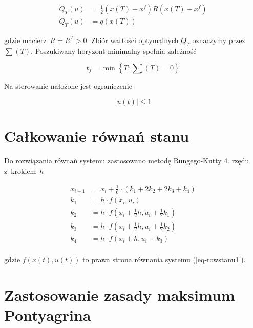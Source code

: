 \documentclass[11pt]{mwart}
\begin{document}
\begin{equation}
	\label{eq-wskjakosci}
	\begin{split}
		Q_{T}\left(u\right) &= \frac{1}{2}\left(x\left(T\right)-x^f\right)R\left(x\left(T\right)-x^f\right) \\
		Q_{T}\left(u\right) &= q\left(x\left(T\right)\right)
	\end{split}
\end{equation}

gdzie macierz~$R=R^T>0$. Zbiór wartości optymalnych $Q_T$ oznaczymy przez~$\sum\left(T\right)$. Poszukiwany horyzont minimalny spełnia zależność

\begin{equation}
	t_{f}=\min\left\{T:\sum\left(T\right)=0\right\}
\end{equation}

Na sterowanie nałożone jest ograniczenie 

\begin{equation}
	\left|u\left(t\right)\right|\leq 1
\end{equation}

\newpage{}

\section{Całkowanie równań stanu}

Do rozwiązania równań systemu zastosowano metodę Rungego-Kutty 4. rzędu z~krokiem~$h$

\begin{equation}
	\begin{split}
		x_{i+1} &= x_{i} + \frac{1}{6}\cdot\left(k_{1}+2k_{2}+2k_{3}+k_{4}\right) \\
		k_{1} &= h\cdot f\left(x_{i},u_{i}\right) \\
		k_{2} &= h\cdot f\left(x_{i}+\frac{1}{2}h,u_{i}+\frac{1}{2}k_{1}\right) \\
		k_{3} &= h\cdot f\left(x_{i}+\frac{1}{2}h,u_{i}+\frac{1}{2}k_{2}\right) \\
		k_{4} &= h\cdot f\left(x_{i}+h,u_{i}+k_{3}\right) \\
	\end{split}
\end{equation}


gdzie $f\left(x\left(t\right),u\left(t\right)\right)$ to prawa strona równania systemu (\ref{eq-rowstanu1}).

\section{Zastosowanie zasady maksimum Pontyagrina}
\end{document}
